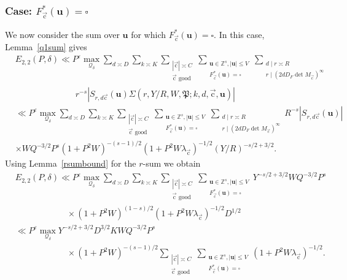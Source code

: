 \documentclass[letterpaper,11pt]{amsart}
\numberwithin{equation}{section}
\theoremstyle{definition}
\numberwithin{equation}{section}
\newcommand{\ZZ}{\mathbb{Z}}
\newcommand{\uu}{\mathbf{u}}
\newcommand{\uc}{{\vec{\mathrm{c}}}}
\newcommand{\ve}{\varepsilon}
\newcommand{\F}{{\underline{F}}}
\begin{document}
\subsubsection{Case: $F_\uc^*(\uu)=\square$}\label{sec:Fcusq}
We now consider the sum over $\uu$ for which $F_\uc^*(\uu)=\square$. In this case, Lemma~\ref{q1sum} gives 
\begin{align*}
&E_{2,2}(P, \delta)\ll P^{\ve}  \max_{ \mathcal Q_\delta}\sum_{d\asymp D}\sum_{k\asymp K}\sum_{\substack{|\uc|\asymp C\\ \uc \text{ good}}}\sum_{\substack{\uu\in\ZZ^s,  |\uu|\leq V\\F_{\uc}^*(\uu)=\square }}\sum_{\substack{d\mid r\asymp R\\ r\mid (2dD_F\det M_\uc)^\infty}}\\ &\quad \quad \quad\quad \quad \quad \quad r^{-s}|S_{r, d\uc}(\uu) \Sigma(r, Y/R, W, \mathfrak P;k,d, \uc, \uu)|\\
& \ll P^{\ve} \max_{ \mathcal Q_\delta} \sum_{d\asymp D}\sum_{k\asymp K}\sum_{\substack{|\uc|\asymp C\\ \uc \text{ good}}}\sum_{\substack{\uu\in\ZZ^s,  |\uu|\leq V\\ F_{\uc}^*(\uu)=\square }}\sum_{\substack{d\mid r\asymp R\\  r\mid (2dD_F\det M_\uc)^\infty}}R^{-s}|S_{r, d\uc}(\uu)| \\
&\times WQ^{-3/2} P^{s} (1+P^2W)^{-(s-1)/2}(1+P^2W\lambda_\uc)^{-1/2} (Y/R)^{-s/2+3/2}.
\end{align*}
Using Lemma~\ref{rsumbound} for the $r$-sum we obtain 
\begin{align*}
&E_{2,2}(P, \delta)\ll P^{\ve} \max_{\mathcal Q_\delta} \sum_{d\asymp D}\sum_{k\asymp K}\sum_{\substack{|\uc|\asymp C\\ \uc \text{ good}}}\sum_{\substack{\uu\in\ZZ^s,  |\uu|\leq V\\ F_{\uc}^*(\uu)=\square }} Y^{-s/2+3/2} WQ^{-3/2} P^{s}\\ &\quad \quad \quad \quad  \quad \quad \times (1+P^2W)^{(1-s)/2}(1+P^2W\lambda_\uc)^{-1/2} D^{1/2}\\
&\ll P^{\ve}\max_{\mathcal Q_\delta} Y^{-s/2+3/2} D^{3/2} K WQ^{-3/2} P^{s} \\ &\quad \quad \quad \quad \quad \quad  \times(1+P^2W)^{-(s-1)/2}\sum_{\substack{|\uc|\asymp C\\ \uc \text{ good}}}\sum_{\substack{\uu\in\ZZ^s, |\uu|\leq V\\ F_{\uc}^*(\uu)=\square }} (1+P^2W\lambda_{\uc})^{-1/2}.
\end{align*}
\end{document}
